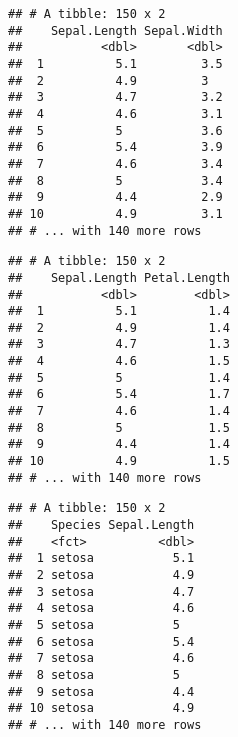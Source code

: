\documentclass[]{book}
\newenvironment{Shaded}{\begin{snugshade}}{\end{snugshade}}
\newcommand{\KeywordTok}[1]{\textcolor[rgb]{0.13,0.29,0.53}{\textbf{#1}}}
\newcommand{\NormalTok}[1]{#1}
\newcommand{\OperatorTok}[1]{\textcolor[rgb]{0.81,0.36,0.00}{\textbf{#1}}}
\newcommand{\StringTok}[1]{\textcolor[rgb]{0.31,0.60,0.02}{#1}}
\begin{document}
\begin{Shaded}
\end{Shaded}

\begin{verbatim}
## # A tibble: 150 x 2
##    Sepal.Length Sepal.Width
##           <dbl>       <dbl>
##  1          5.1         3.5
##  2          4.9         3  
##  3          4.7         3.2
##  4          4.6         3.1
##  5          5           3.6
##  6          5.4         3.9
##  7          4.6         3.4
##  8          5           3.4
##  9          4.4         2.9
## 10          4.9         3.1
## # ... with 140 more rows
\end{verbatim}

\begin{Shaded}
\end{Shaded}

\begin{verbatim}
## # A tibble: 150 x 2
##    Sepal.Length Petal.Length
##           <dbl>        <dbl>
##  1          5.1          1.4
##  2          4.9          1.4
##  3          4.7          1.3
##  4          4.6          1.5
##  5          5            1.4
##  6          5.4          1.7
##  7          4.6          1.4
##  8          5            1.5
##  9          4.4          1.4
## 10          4.9          1.5
## # ... with 140 more rows
\end{verbatim}

\begin{Shaded}
\end{Shaded}

\begin{verbatim}
## # A tibble: 150 x 2
##    Species Sepal.Length
##    <fct>          <dbl>
##  1 setosa           5.1
##  2 setosa           4.9
##  3 setosa           4.7
##  4 setosa           4.6
##  5 setosa           5  
##  6 setosa           5.4
##  7 setosa           4.6
##  8 setosa           5  
##  9 setosa           4.4
## 10 setosa           4.9
## # ... with 140 more rows
\end{verbatim}
\end{document}
